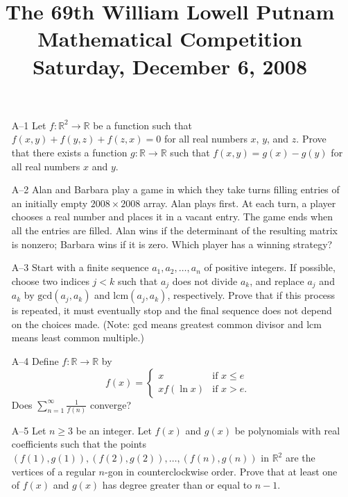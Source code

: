 \documentclass[amssymb,twocolumn,pra,10pt,aps]{revtex4-1}
\begin{document}
\title{The 69th William Lowell Putnam Mathematical Competition \\
    Saturday, December 6, 2008}
\maketitle

\begin{itemize}

\item[A--1]
Let $f: \mathbb{R}^2 \to \mathbb{R}$ be a function such that $f(x,y) + f(y,z)
+ f(z,x) = 0$ for all real numbers $x$, $y$, and $z$. Prove that there exists
a function $g: \mathbb{R} \to \mathbb{R}$ such that $f(x,y) = g(x) - g(y)$
for all real numbers $x$ and $y$.

\item[A--2]
Alan and Barbara play a game in which they take turns filling entries of
an initially empty $2008 \times 2008$ array. Alan plays first. At each
turn, a player chooses a real number and places it in a vacant entry.
The game ends when all the entries are filled. Alan wins if the
determinant of the resulting matrix is nonzero; Barbara wins if it is zero.
Which player has a winning strategy?

\item[A--3]
Start with a finite sequence $a_1, a_2, \dots, a_n$ of positive integers.
If possible, choose two indices $j < k$ such that $a_j$ does not divide
$a_k$, and replace $a_j$ and $a_k$ by $\mathrm{gcd}(a_j, a_k)$
and $\mathrm{lcm}(a_j, a_k)$, respectively. Prove that if this process is
repeated, it must eventually stop and the final sequence does not depend
on the choices made. (Note: gcd means greatest common divisor and lcm
means least common multiple.)

\item[A--4]
Define $f: \mathbb{R} \to \mathbb{R}$ by
\[
f(x) = \begin{cases} x & \mbox{if $x \leq e$} \\ x f(\ln x) &
\mbox{if $x > e$.} \end{cases}
\]
Does $\sum_{n=1}^\infty \frac{1}{f(n)}$ converge?

\item[A--5]
Let $n \geq 3$ be an integer. Let $f(x)$ and $g(x)$ be polynomials
with real coefficients such that the points
$(f(1), g(1)), (f(2), g(2)), \dots, (f(n), g(n))$
in $\mathbb{R}^2$ are the vertices of a regular $n$-gon in
counterclockwise order. Prove that at least one of $f(x)$
and $g(x)$ has degree greater than or equal to $n-1$.


\end{itemize}
\end{document}
